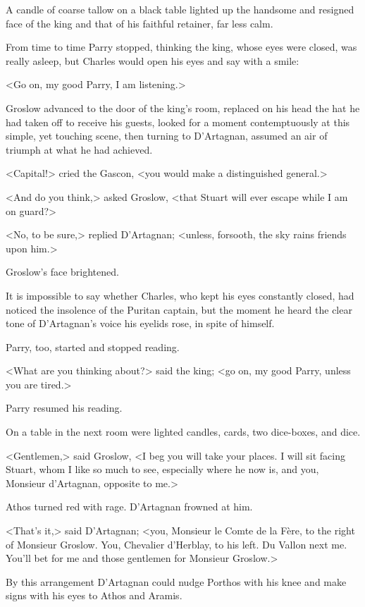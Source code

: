 A candle of coarse tallow on a black table lighted up the handsome and resigned face of the king and that of his faithful retainer, far less calm.

From time to time Parry stopped, thinking the king, whose eyes were closed, was really asleep, but Charles would open his eyes and say with a smile:

<Go on, my good Parry, I am listening.>

Groslow advanced to the door of the king's room, replaced on his head the hat he had taken off to receive his guests, looked for a moment contemptuously at this simple, yet touching scene, then turning to D'Artagnan, assumed an air of triumph at what he had achieved.

<Capital!> cried the Gascon, <you would make a distinguished general.>

<And do you think,> asked Groslow, <that Stuart will ever escape while I am on guard?>

<No, to be sure,> replied D'Artagnan; <unless, forsooth, the sky rains friends upon him.>

Groslow's face brightened.

It is impossible to say whether Charles, who kept his eyes constantly closed, had noticed the insolence of the Puritan captain, but the moment he heard the clear tone of D'Artagnan's voice his eyelids rose, in spite of himself.

Parry, too, started and stopped reading.

<What are you thinking about?> said the king; <go on, my good Parry, unless you are tired.>

Parry resumed his reading.

On a table in the next room were lighted candles, cards, two dice-boxes, and dice.

<Gentlemen,> said Groslow, <I beg you will take your places. I will sit facing Stuart, whom I like so much to see, especially where he now is, and you, Monsieur d'Artagnan, opposite to me.>

Athos turned red with rage. D'Artagnan frowned at him.

<That's it,> said D'Artagnan; <you, Monsieur le Comte de la Fère, to the right of Monsieur Groslow. You, Chevalier d'Herblay, to his left. Du Vallon next me. You'll bet for me and those gentlemen for Monsieur Groslow.>

By this arrangement D'Artagnan could nudge Porthos with his knee and make signs with his eyes to Athos and Aramis.


